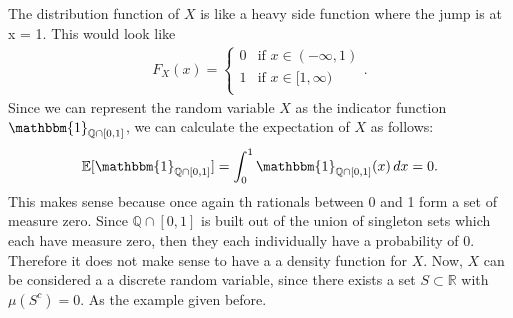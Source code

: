 \documentclass[10pt]{amsart}
\begin{document}
\noindent
The distribution function of $X$ is like a heavy side function where the jump is at x = 1.
This would look like
\begin{align*}
F_X(x) = 
\left\{
    \begin{array}{lr}
        0 & \text{if } x \in (-\infty, 1) \\
        1 & \text{if } x \in [1, \infty) \\
    \end{array}
\right..
\end{align*}
Since we can represent the random variable $X$ as the indicator function $\mathbbm{1}_{\mathbb{Q} \cap [0, 1]}$, we can calculate the expectation of $X$ as follows:
$$\mathbb{E}[\mathbbm{1}_{\mathbb{Q} \cap [0, 1]}] = \int_0^1 \mathbbm{1}_{\mathbb{Q} \cap [0, 1]}(x) \, dx = 0.$$
This makes sense because once again th rationals between 0 and 1 form a set of measure zero.
Since $\mathbb{Q} \cap [0, 1]$ is built out of the union of singleton sets which each have measure zero, then they each individually have a probability of 0.
Therefore it does not make sense to have a a density function for $X$.
Now, $X$ can be considered a a discrete random variable, since there exists a set $S \subset \mathbb R$ with $\mu(S^c) = 0$. As the example given before.
\end{document}
